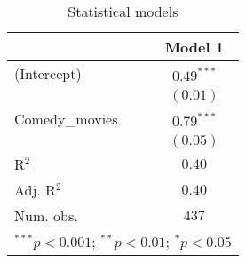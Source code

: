 
\begin{table}
\begin{center}
\begin{tabular}{l c}
\hline
 & Model 1 \\
\hline
(Intercept)    & $0.49^{***}$ \\
               & $(0.01)$     \\
Comedy\_movies & $0.79^{***}$ \\
               & $(0.05)$     \\
\hline
R$^2$          & $0.40$       \\
Adj. R$^2$     & $0.40$       \\
Num. obs.      & $437$        \\
\hline
\multicolumn{2}{l}{\scriptsize{$^{***}p<0.001$; $^{**}p<0.01$; $^{*}p<0.05$}}
\end{tabular}
\caption{Statistical models}
\label{table:coefficients}
\end{center}
\end{table}
